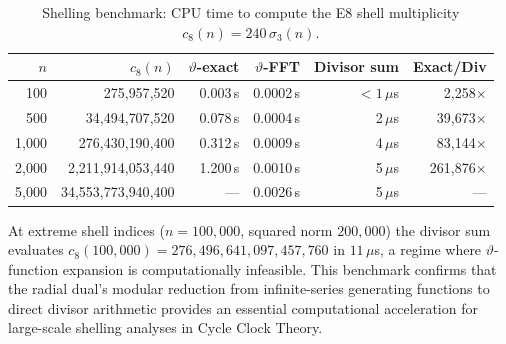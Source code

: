 \documentclass{article}
\begin{document}
\begin{table}[htbp]
\centering
\caption{Shelling benchmark: CPU time to compute the E8 shell multiplicity $c_8(n) = 240\,\sigma_3(n)$.}
\label{tab:shelling-benchmark}
\begin{tabular}{r|r|r|r|r|r}
$n$ & $c_8(n)$ & $\vartheta$-exact & $\vartheta$-FFT & Divisor sum & Exact/Div \\
\hline
  100 & 275{,}957{,}520          & 0.003\,s & 0.0002\,s & $<\!1\,\mu$s & 2{,}258$\times$ \\
  500 & 34{,}494{,}707{,}520     & 0.078\,s & 0.0004\,s & 2\,$\mu$s & 39{,}673$\times$ \\
1{,}000 & 276{,}430{,}190{,}400 & 0.312\,s & 0.0009\,s & 4\,$\mu$s & 83{,}144$\times$ \\
2{,}000 & 2{,}211{,}914{,}053{,}440 & 1.200\,s & 0.0010\,s & 5\,$\mu$s & 261{,}876$\times$ \\
5{,}000 & 34{,}553{,}773{,}940{,}400 & — & 0.0026\,s & 5\,$\mu$s & —
\end{tabular}
\end{table}

At extreme shell indices ($n = 100{,}000$, squared norm $200{,}000$) the divisor sum evaluates $c_8(100{,}000) = 276{,}496{,}641{,}097{,}457{,}760$ in $11\,\mu$s, a regime where $\vartheta$-function expansion is computationally infeasible. This benchmark confirms that the radial dual's modular reduction from infinite-series generating functions to direct divisor arithmetic provides an essential computational acceleration for large-scale shelling analyses in Cycle Clock Theory.
\end{document}
